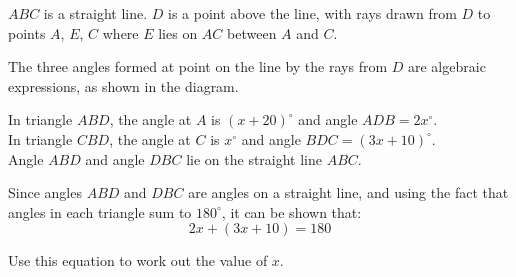\begin{question}
\noindent $ABC$ is a straight line. $D$ is a point above the line, with rays drawn from $D$ to points $A$, $E$, $C$ where $E$ lies on $AC$ between $A$ and $C$.

The three angles formed at point on the line by the rays from $D$ are algebraic expressions, as shown in the diagram.

\begin{center}
\end{center}

\noindent In triangle $ABD$, the angle at $A$ is $(x+20)^{\circ}$ and angle $ADB = 2x^{\circ}$.\\
In triangle $CBD$, the angle at $C$ is $x^{\circ}$ and angle $BDC = (3x+10)^{\circ}$.\\
Angle $ABD$ and angle $DBC$ lie on the straight line $ABC$.

Since angles $ABD$ and $DBC$ are angles on a straight line, and using the fact that angles in each triangle sum to $180^{\circ}$, it can be shown that:
\[
2x + (3x+10) = 180
\]

Use this equation to work out the value of $x$.

\vspace{4cm}

\begin{flushright}
\end{flushright}
\end{question}
